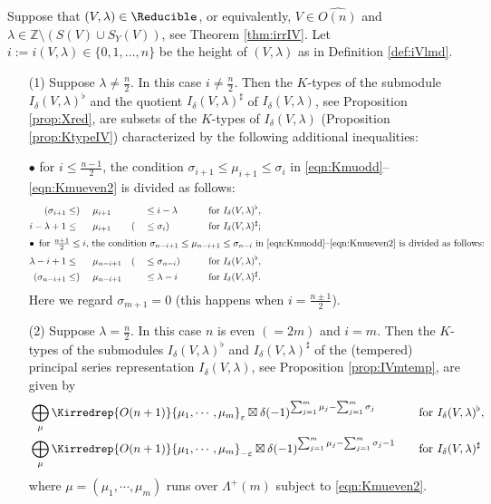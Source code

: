 \begin{proposition}
\label{prop:KXred}
Suppose that $(V,\lambda) \in \Reducible$, 
 or equivalently, 
 $V \in \widehat{O(n)}$
 and $\lambda \in {\mathbb{Z}} \setminus(S(V) \cup S_Y(V))$, 
 see Theorem \ref{thm:irrIV}.  
Let 
$i:=i(V,\lambda) \in \{0,1,\ldots,n\}$
 be the height of $(V,\lambda)$
as in Definition \ref{def:iVlmd}.  
\begin{enumerate}
\item[{\rm{(1)}}]
Suppose $\lambda \ne \frac n2$.  
In this case $i \ne \frac n 2$. 
Then the $K$-types of the submodule $I_{\delta}(V,\lambda)^{\flat}$
 and the quotient $I_{\delta}(V,\lambda)^{\sharp}$
 of $I_{\delta}(V,\lambda)$, 
 see Proposition \ref{prop:Xred}, 
 are subsets of the $K$-types of $I_{\delta}(V,\lambda)$
 (Proposition \ref{prop:KtypeIV})
 characterized by the following additional inequalities:
\par\noindent
$\bullet$\enspace
for $i \le \frac{n-1}2$, 
the condition $\sigma_{i+1} \le \mu_{i+1} \le \sigma_i$
 in \eqref{eqn:Kmuodd}--\eqref{eqn:Kmueven2}
 is divided as follows:
\begin{alignat*}{5}
(\sigma_{i+1} 
&\le)\,\,
&&\mu_{i+1} 
&& 
&&\le i-\lambda
\qquad
&&\text{for $I_{\delta}(V,\lambda)^{\flat}$}, 
\\
 i-\lambda+1
&\le\,\,
&&\mu_{i+1} 
&& (
&&\le \sigma_i)
\qquad
&&\text{for $I_{\delta}(V,\lambda)^{\sharp}$};
\\
\intertext{$\bullet$\enspace for $\frac{n+1}{2}\le i$, 
the condition $\sigma_{n-i+1} \le \mu_{n-i+1} \le \sigma_{n-i}$
 in \eqref{eqn:Kmuodd}--\eqref{eqn:Kmueven2}
 is divided as follows:}
 \lambda-i+1 
&\le\,\,
&&\mu_{n-i+1} 
&& (
&&\le \sigma_{n-i})
\qquad
&&\text{for $I_{\delta}(V,\lambda)^{\flat}$}, 
\\
(\sigma_{n-i+1} 
&\le)\,\,
&&\mu_{n-i+1} 
&& 
&&\le \lambda-i
\qquad
&&\text{for $I_{\delta}(V,\lambda)^{\sharp}$}.  
\end{alignat*}
Here we regard $\sigma_{m+1}=0$
 (this happens when $i=\frac{n \pm 1}{2}$).  
\item[{\rm{(2)}}]
Suppose $\lambda =\frac n 2$.  
In this case $n$ is even $(=2m)$ and $i=m$.  
Then the $K$-types
 of the submodules $I_{\delta}(V,\lambda)^{\flat}$
 and $I_{\delta}(V,\lambda)^{\sharp}$
 of the (tempered) principal series representation
 $I_{\delta}(V,\lambda)$, 
 see Proposition \ref{prop:IVmtemp}, 
 are given by 
\begin{alignat*}{2}
  &\bigoplus_{\mu}
  \Kirredrep{O(n+1)}{\mu_1, \cdots,\mu_{m}}_{\varepsilon}
  \boxtimes 
   \delta(-1)^{\sum_{j=1}^{m} \mu_j - \sum_{j=1}^{m}\sigma_j}
   \quad
&&\text{for $I_{\delta}(V,\lambda)^{\flat}$}, 
\\
  &\bigoplus_{\mu}
  \Kirredrep{O(n+1)}{\mu_1, \cdots,\mu_{m}}_{-\varepsilon}
  \boxtimes 
   \delta(-1)^{\sum_{j=1}^{m} \mu_j - \sum_{j=1}^{m}\sigma_j-1}
   \quad
&&\text{for $I_{\delta}(V,\lambda)^{\sharp}$}
\end{alignat*}
where $\mu=(\mu_1, \cdots,\mu_{m})$
 runs over $\Lambda^+(m)$
 subject to \eqref{eqn:Kmueven2}.  
\end{enumerate}
\end{proposition}

